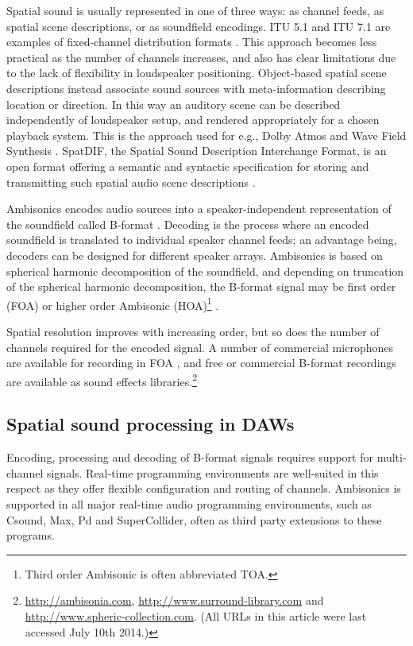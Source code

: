 \documentclass{article}
\begin{document}
Spatial sound is usually represented in one of three ways: as channel feeds, as spatial scene descriptions, or as soundfield encodings.
ITU 5.1 and ITU 7.1 are examples of fixed-channel distribution formats \cite{ITU:1993_surround_5:1}.
This approach becomes less practical as the number of channels increases, and also has clear limitations due to the lack of flexibility in loudspeaker positioning.
Object-based spatial scene descriptions instead associate sound sources with meta-information describing location or direction. In this way an auditory scene can be described independently of loudspeaker setup, and rendered appropriately for a chosen playback system.
This is the approach used for e.g., Dolby Atmos and Wave Field Synthesis \cite{dolby:2014atmos,Berkhout:1993wfs}.
SpatDIF, the Spatial Sound Description Interchange Format, is an open format offering a semantic and syntactic specification for storing and transmitting such spatial audio scene descriptions \cite{Peters:2013spatdif}.

Ambisonics encodes audio sources into a speaker-inde\-pendent representation of the soundfield called B-format \cite{gerzon:1985JAES}.
Decoding is the process where an encoded soundfield is translated to individual speaker channel feeds; an advantage being,  decoders can be designed for different speak\-er arrays.
Ambisonics is based on spherical harmonic decomposition of the soundfield, and depending on truncation of the spherical harmonic decomposition, 
the B-for\-mat signal may be first order (FOA) or higher order Ambisonic (HOA)\footnote{Third order Ambisonic is often abbreviated TOA.} \cite{daniel:2001phd}.

Spatial resolution improves with increasing order, but so does the number of channels required for the encoded signal.
A number of commercial microphones are available for recording in FOA \cite{farrar:1979soundfield}, and free or commercial B-format recordings are available as sound effects libraries.\footnote{\href{http://ambisonia.com}{http://ambisonia.com}, \href{http://www.surround-library.com}{http://www.surround-library.com} and \href{http://www.spheric-collection.com}{http://www.spheric-collection.com}. (All URLs in this article were last accessed July 10th 2014.)}


\subsection{Spatial sound processing in DAWs}\label{sec:daws}

Encoding, processing and decoding of B-format signals requires support for multi-channel signals.
Real-time programming environments are well-suited in this respect as they offer flexible configuration and routing of channels. Ambisonics is supported in all major real-time audio programming environments, such as Csound, Max, Pd and SuperCollider, often as third party extensions to these programs.
\end{document}
